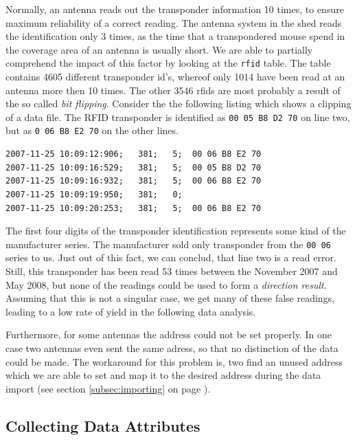 Normally, an antenna reads out the transponder information 10 times, to ensure maximum reliability of a correct reading. The antenna system in the shed reads the identification only 3 times, as the time that a transpondered mouse spend in the coverage area of an antenna is usually short. We are able to partially comprehend the impact of this factor by looking at the \lstinline|rfid| table. The table contains 4605 different transponder id's, whereof only 1014 have been read at an antenna more then 10 times. The other 3546 rfids are most probably a result of the so called \textit{bit flipping}. Consider the the following listing which shows a clipping of a data file. The \ac{RFID} transponder is identified as \lstinline|00 05 B8 D2 70| on line two, but as \lstinline|0 06 B8 E2 70| on the other lines. 

\numcodestyle
\begin{lstlisting}[frame=none]
2007-11-25 10:09:12:906;   381;   5;  00 06 B8 E2 70
2007-11-25 10:09:16:529;   381;   5;  00 05 B8 D2 70
2007-11-25 10:09:16:932;   381;   5;  00 06 B8 E2 70
2007-11-25 10:09:19:950;   381;   0; 
2007-11-25 10:09:20:253;   381;   5;  00 06 B8 E2 70
\end{lstlisting}

The first four digits of the transponder identification represents some kind of the manufacturer series. The manufacturer sold only transponder from the \lstinline|00 06| series to us. Just out of this fact, we can conclud, that line two is a read error. Still, this transponder has been read 53 times between the November 2007 and May 2008, but none of the readings could be used to form a \textit{direction result}. Assuming that this is not a singular case, we get many of these false readings, leading to a low rate of yield in the following data analysis. 

Furthermore, for some antennas the address could not be set properly. In one case two antennas even sent the same adress, so that no distinction of the data could be made. The workaround for this problem is, two find an unused address which we are able to set and map it to the desired address during the data import (see section \ref{subsec:importing} on page \pageref{subsec:importing}).   

\subsection{Collecting Data Attributes}
\label{subsec:dataattr}

